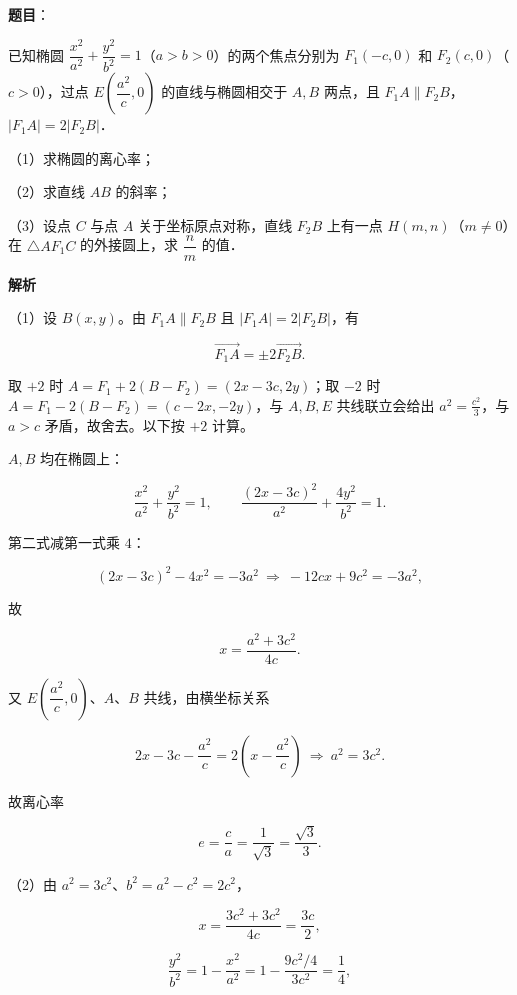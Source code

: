 \begin{answer}

\textbf{题目}：

已知椭圆 $\dfrac{x^2}{a^2}+\dfrac{y^2}{b^2}=1$（$a>b>0$）的两个焦点分别为 $F_1(-c,0)$ 和 $F_2(c,0)$（$c>0$），过点 $E\left(\dfrac{a^2}{c},0\right)$ 的直线与椭圆相交于 $A,B$ 两点，且 $F_1A\parallel F_2B$，$|F_1A|=2|F_2B|$．

（1）求椭圆的离心率；

（2）求直线 $AB$ 的斜率；

（3）设点 $C$ 与点 $A$ 关于坐标原点对称，直线 $F_2B$ 上有一点 $H(m,n)$（$m\neq0$）在 $\triangle AF_1C$ 的外接圆上，求 $\dfrac nm$ 的值．

\textbf{解析}

（1）设 $B(x,y)$。由 $F_1A\parallel F_2B$ 且 $|F_1A|=2|F_2B|$，有

\nopagebreak[4]
\[\overrightarrow{F_1A}=\pm2\overrightarrow{F_2B}.\]

取 $+2$ 时 $A=F_1+2(B-F_2)=(2x-3c,2y)$；取 $-2$ 时 $A=F_1-2(B-F_2)=(c-2x,-2y)$，与 $A,B,E$ 共线联立会给出 $a^2=\frac{c^2}{3}$，与 $a>c$ 矛盾，故舍去。以下按 $+2$ 计算。

$A,B$ 均在椭圆上：

\nopagebreak[4]
\[\frac{x^2}{a^2}+\frac{y^2}{b^2}=1,\qquad
\frac{(2x-3c)^2}{a^2}+\frac{4y^2}{b^2}=1 .\]

第二式减第一式乘 $4$：

\nopagebreak[4]
\[(2x-3c)^2-4x^2=-3a^2
\ \Longrightarrow\ -12cx+9c^2=-3a^2,\]

故

\nopagebreak[4]
\[x=\frac{a^2+3c^2}{4c} .\]

又 $E\left(\dfrac{a^2}{c},0\right)$、$A$、$B$ 共线，由横坐标关系

\nopagebreak[4]
\[2x-3c-\frac{a^2}{c}=2\left(x-\frac{a^2}{c}\right)
\ \Longrightarrow\ a^2=3c^2 .\]

故离心率

\nopagebreak[4]
\[e=\frac ca=\frac1{\sqrt3}=\frac{\sqrt3}{3} .\]

（2）由 $a^2=3c^2$、$b^2=a^2-c^2=2c^2$，

\nopagebreak[4]
\[x=\frac{3c^2+3c^2}{4c}=\frac{3c}{2},\]

\nopagebreak[4]
\[\frac{y^2}{b^2}=1-\frac{x^2}{a^2}
=1-\frac{9c^2/4}{3c^2}=\frac14,\]


\end{answer}
